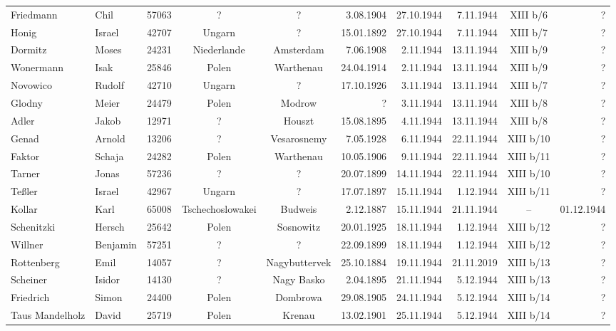 \begin{tiny}
\begin{longtable}[l]{|l|l|r|c|c|r|r|r|c|r|}
Friedmann  &  Chil  & 57063 &  ?  &  ?  & 3.08.1904 & 27.10.1944 & 7.11.1944 &  XIII b/6  &  ? \\[3pt]
Honig  &  Israel  & 42707 &  Ungarn  &  ?  & 15.01.1892 & 27.10.1944 & 7.11.1944 &  XIII b/7  &  ? \\[3pt]
Dormitz  &  Moses  & 24231 &  Niederlande  &  Amsterdam  & 7.06.1908 & 2.11.1944 & 13.11.1944 &  XIII b/9  &  ? \\[3pt]
Wonermann  &  Isak  & 25846 &  Polen  &  Warthenau  & 24.04.1914 & 2.11.1944 & 13.11.1944 &  XIII b/9  &  ? \\[3pt]
Novowico  &  Rudolf  & 42710 &  Ungarn  &  ?  & 17.10.1926 & 3.11.1944 & 13.11.1944 &  XIII b/7  &  ? \\[3pt]
Glodny  &  Meier  & 24479 &  Polen  &  Modrow  & ?  & 3.11.1944 & 13.11.1944 &  XIII b/8  &  ? \\[3pt]
Adler  &  Jakob  & 12971 &  ?  &  Houszt  & 15.08.1895 & 4.11.1944 & 13.11.1944 &  XIII b/8  &  ? \\[3pt]
Genad  &  Arnold  & 13206 &  ?  &  Vesarosnemy  & 7.05.1928 & 6.11.1944 & 22.11.1944 &  XIII b/10  &  ? \\[3pt]
Faktor  &  Schaja  & 24282 &  Polen  &  Warthenau  & 10.05.1906 & 9.11.1944 & 22.11.1944 &  XIII b/11  &  ? \\[3pt]
Tarner  &  Jonas  & 57236 &  ?  &  ?  & 20.07.1899 & 14.11.1944 & 22.11.1944 &  XIII b/10  &  ? \\[3pt]
Teßler  &  Israel  & 42967 &  Ungarn  &  ?  & 17.07.1897 & 15.11.1944 & 1.12.1944 &  XIII b/11  &  ? \\[3pt]
Kollar  &  Karl  & 65008 &  Tschechoslowakei  &  Budweis  & 2.12.1887 & 15.11.1944 & 21.11.1944 &  --  &  01.12.1944 \\[3pt]
Schenitzki  &  Hersch  & 25642 &  Polen  &  Sosnowitz  & 20.01.1925 & 18.11.1944 & 1.12.1944 &  XIII b/12  &  ? \\[3pt]
Willner  &  Benjamin  & 57251 &  ?  &  ?  & 22.09.1899 & 18.11.1944 & 1.12.1944 &  XIII b/12  &  ? \\[3pt]
Rottenberg  &  Emil  & 14057 &  ?  &  Nagybuttervek  & 25.10.1884 & 19.11.1944 & 21.11.2019 &  XIII b/13  &  ? \\[3pt]
Scheiner  &  Isidor  & 14130 &  ?  &  Nagy Basko  & 2.04.1895 & 21.11.1944 & 5.12.1944 &  XIII b/13  &  ? \\[3pt]
Friedrich  &  Simon  & 24400 &  Polen  &  Dombrowa  & 29.08.1905 & 24.11.1944 & 5.12.1944 &  XIII b/14  &  ? \\[3pt]
Taus Mandelholz  &  David  & 25719 &  Polen  &  Krenau  & 13.02.1901 & 25.11.1944 & 5.12.1944 &  XIII b/14  &  ? \\[3pt]

\end{longtable}
\end{tiny}
